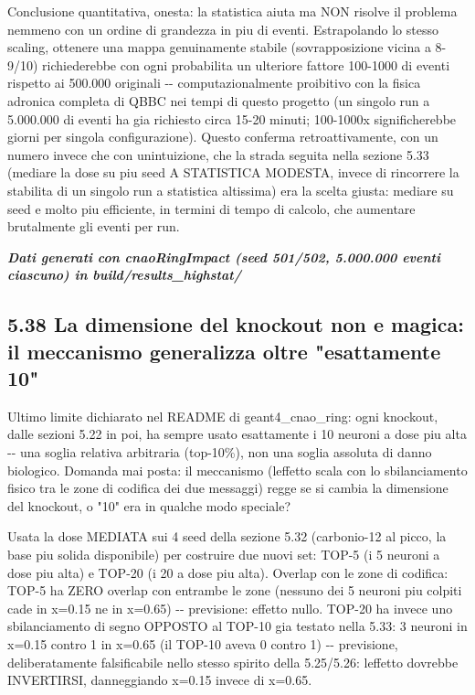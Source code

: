 \documentclass[
  italian,
]{article}
\begin{document}
Conclusione quantitativa, onesta: la statistica aiuta ma NON risolve il problema nemmeno con un ordine di grandezza in piu\textquotesingle{} di eventi. Estrapolando lo stesso scaling, ottenere una mappa genuinamente stabile (sovrapposizione vicina a 8-9/10) richiederebbe con ogni probabilita\textquotesingle{} un ulteriore fattore 100-1000 di eventi rispetto ai 500.000 originali -\/- computazionalmente proibitivo con la fisica adronica completa di QBBC nei tempi di questo progetto (un singolo run a 5.000.000 di eventi ha gia\textquotesingle{} richiesto circa 15-20 minuti; 100-1000x significherebbe giorni per singola configurazione). Questo conferma retroattivamente, con un numero invece che con un\textquotesingle intuizione, che la strada seguita nella sezione 5.33 (mediare la dose su piu\textquotesingle{} seed A STATISTICA MODESTA, invece di rincorrere la stabilita\textquotesingle{} di un singolo run a statistica altissima) era la scelta giusta: mediare su seed e\textquotesingle{} molto piu\textquotesingle{} efficiente, in termini di tempo di calcolo, che aumentare brutalmente gli eventi per run.

\emph{\textbf{Dati generati con cnaoRingImpact (seed 501/502, 5.000.000 eventi ciascuno) in build/results\_\allowbreak{}highstat/}}

\subsection{5.38 La dimensione del knockout non e\textquotesingle{} magica: il meccanismo generalizza oltre "esattamente 10"}\label{la-dimensione-del-knockout-non-e-magica-il-meccanismo-generalizza-oltre-esattamente-10}

Ultimo limite dichiarato nel README di geant4\_\allowbreak{}cnao\_\allowbreak{}ring: ogni knockout, dalle sezioni 5.22 in poi, ha sempre usato esattamente i 10 neuroni a dose piu\textquotesingle{} alta -\/- una soglia relativa arbitraria (top-10\%), non una soglia assoluta di danno biologico. Domanda mai posta: il meccanismo (l\textquotesingle effetto scala con lo sbilanciamento fisico tra le zone di codifica dei due messaggi) regge se si cambia la dimensione del knockout, o "10" era in qualche modo speciale?

Usata la dose MEDIATA sui 4 seed della sezione 5.32 (carbonio-12 al picco, la base piu\textquotesingle{} solida disponibile) per costruire due nuovi set: TOP-5 (i 5 neuroni a dose piu\textquotesingle{} alta) e TOP-20 (i 20 a dose piu\textquotesingle{} alta). Overlap con le zone di codifica: TOP-5 ha ZERO overlap con entrambe le zone (nessuno dei 5 neuroni piu\textquotesingle{} colpiti cade in x=0.15 ne\textquotesingle{} in x=0.65) -\/- previsione: effetto nullo. TOP-20 ha invece uno sbilanciamento di segno OPPOSTO al TOP-10 gia\textquotesingle{} testato nella 5.33: 3 neuroni in x=0.15 contro 1 in x=0.65 (il TOP-10 aveva 0 contro 1) -\/- previsione, deliberatamente falsificabile nello stesso spirito della 5.25/5.26: l\textquotesingle effetto dovrebbe INVERTIRSI, danneggiando x=0.15 invece di x=0.65.
\end{document}
